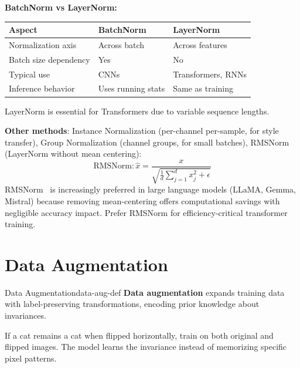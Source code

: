 \documentclass[../../main.tex]{subfiles}
\begin{document}
\begin{keyconcept}
\textbf{BatchNorm vs LayerNorm:}
\begin{center}
\begin{tabular}{lll}
\toprule
\textbf{Aspect} & \textbf{BatchNorm} & \textbf{LayerNorm} \\
\midrule
Normalization axis & Across batch & Across features \\
Batch size dependency & Yes & No \\
Typical use & CNNs & Transformers, RNNs \\
Inference behavior & Uses running stats & Same as training \\
\bottomrule
\end{tabular}
\end{center}
LayerNorm is essential for Transformers due to variable sequence lengths.
\end{keyconcept}

\textbf{Other methods}: Instance Normalization (per-channel per-sample, for style transfer), Group Normalization (channel groups, for small batches), RMSNorm (LayerNorm without mean centering):
\[
    \text{RMSNorm}: \hat{x} = \frac{x}{\sqrt{\frac{1}{d}\sum_{j=1}^d x_j^2 + \epsilon}}
\]
RMSNorm~\cite{zhang2019rmsnorm} is increasingly preferred in large language models (LLaMA, Gemma, Mistral) because removing mean-centering offers computational savings with negligible accuracy impact. Prefer RMSNorm for efficiency-critical transformer training.

\section{Data Augmentation}
\label{sec:data-augmentation}

\begin{definition}{Data Augmentation}{data-aug-def}
\textbf{Data augmentation} expands training data with label-preserving transformations, encoding prior knowledge about invariances.
\end{definition}

\begin{principle}
If a cat remains a cat when flipped horizontally, train on both original and flipped images. The model learns the invariance instead of memorizing specific pixel patterns.
\end{principle}
\end{document}
